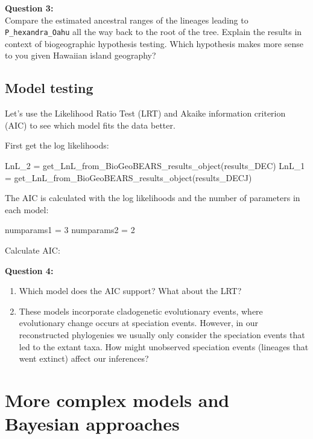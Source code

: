 \documentclass[11pt]{article}
\begin{document}
\begin{framed}
\noindent
\textbf{Question 3:} \\
Compare the estimated ancestral ranges of the lineages
leading to \texttt{P\_hexandra\_Oahu} all the way back to the root
of the tree.
Explain the results in context of biogeographic hypothesis
testing. Which hypothesis makes more sense to you given Hawaiian island geography?
\end{framed}

\subsection{Model testing}

Let's use 
the Likelihood Ratio Test (LRT) and
Akaike information criterion (AIC)
to see which model fits the data better.

First get the log likelihoods:
\begin{code}
LnL_2 = get_LnL_from_BioGeoBEARS_results_object(results_DEC)
LnL_1 = get_LnL_from_BioGeoBEARS_results_object(results_DECJ)
\end{code}
The AIC is calculated with the log likelihoods and the number
of parameters in each model:
\begin{code}
numparams1 = 3
numparams2 = 2
\end{code}
Calculate AIC:

\begin{framed}
\noindent
\textbf{Question 4:} \\
\begin{enumerate}
\item Which model does the AIC support?
        What about the LRT?
\item These models incorporate cladogenetic evolutionary events, 
        where evolutionary change occurs at speciation events.
        However, in our reconstructed phylogenies we usually only consider
        the speciation events that led to the extant taxa.
        How might unobserved speciation events (lineages that went extinct)
        affect our inferences?
\end{enumerate}
\end{framed}

\section{More complex models and Bayesian approaches}
\end{document}
